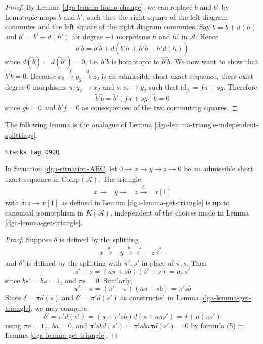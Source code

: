 \begin{proof}

By Lemma \ref{dga-lemma-homo-change}, we can replace $b$ and $b'$
by homotopic maps $\tilde{b}$ and $\tilde{b}'$, such that the right
square of the left diagram commutes and the left square of the right
diagram commutes. Say $b = \tilde{b} + d(h)$ and $b'=\tilde{b}'+d(h')$
for degree $-1$ morphisms $h$ and $h'$ in $\mathcal{A}$. Hence
$$
b'b = \tilde{b}'\tilde{b} + d(\tilde{b}'h + h'\tilde{b} + h'd(h))
$$
since $d(\tilde{b})=d(\tilde{b}')=0$, i.e. $b'b$ is homotopic to
$\tilde{b}'\tilde{b}$. We now want to show that $\tilde{b}'\tilde{b}=0$.
Because $x_2\xrightarrow{f} y_2\xrightarrow{g} z_2$ is an admissible
short exact sequence, there exist degree $0$ morphisms
$\pi : y_2 \to x_2$ and $s : z_2 \to y_2$ such that
$\text{id}_{y_2} = f\pi + sg$. Therefore
$$
\tilde{b}'\tilde{b} = \tilde{b}'(f\pi + sg)\tilde{b} = 0
$$
since $g\tilde{b} = 0$ and $\tilde{b}'f = 0$ as consequences
of the two commuting squares.
\end{proof}

The following lemma is the analogue of
Lemma \ref{dga-lemma-triangle-independent-splittings}.

\begin{lemma}
\label{dga-lemma-analogue-triangle-independent-splittings}
\href{https://stacks.math.columbia.edu/tag/09QQ}{\texttt{Stacks tag 09QQ}}

In Situation \ref{dga-situation-ABC}
let $0 \to x \to y \to z \to 0$ be an admissible short
exact sequence in $\text{Comp}(\mathcal{A})$. The triangle
$$
\begin{array}{cccc}x\longrightarrow & y\longrightarrow & z\overset{\delta}{\longrightarrow} & x[1]\end{array}
$$
with $\delta : z \to x[1]$ as defined in Lemma \ref{dga-lemma-get-triangle}
is up to canonical isomorphism in $K(\mathcal{A})$, independent of the
choices made in Lemma \ref{dga-lemma-get-triangle}.
\end{lemma}

\begin{proof}

Suppose $\delta$ is defined by the splitting
$$
\begin{array}{ccc}x \overset{a}{\longrightarrow} & y \overset{b}{\longrightarrow}\overset{\pi}{\longleftarrow} & z \overset{s}{\longleftarrow}\end{array}
$$
and $\delta'$ is defined by the splitting with $\pi',s'$
in place of $\pi,s$. Then
$$
s'-s = (a\pi + sb)(s'-s) = a\pi s'
$$
since $bs' = bs = 1_z$ and $\pi s = 0$. Similarly,
$$
\pi' - \pi = (\pi' - \pi)(a\pi + sb) = \pi'sb
$$
Since $\delta = \pi d(s)$ and $\delta' = \pi'd(s')$
as constructed in Lemma \ref{dga-lemma-get-triangle}, we may compute
$$
\delta' = \pi'd(s') = (\pi + \pi'sb)d(s + a\pi s') = \delta + d(\pi s')
$$
using $\pi a = 1_x$, $ba = 0$, and $\pi'sbd(s') = \pi'sba\pi d(s') = 0$
by formula (5) in Lemma \ref{dga-lemma-get-triangle}.
\end{proof}

